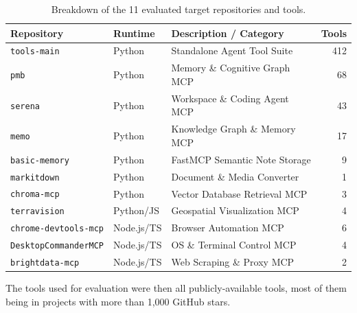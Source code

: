 \begin{table}[h]
\centering
\caption{Breakdown of the 11 evaluated target repositories and tools.}
\label{tab:evaluation_repositories}
\begin{tabular}{lllr}
\hline
\textbf{Repository} & \textbf{Runtime} & \textbf{Description / Category} & \textbf{Tools} \\
\hline
\texttt{tools-main}          & Python     & Standalone Agent Tool Suite    & 412 \\
\texttt{pmb}                 & Python     & Memory \& Cognitive Graph MCP  &  68 \\
\texttt{serena}              & Python     & Workspace \& Coding Agent MCP  &  43 \\
\texttt{memo}                & Python     & Knowledge Graph \& Memory MCP  &  17 \\
\texttt{basic-memory}        & Python     & FastMCP Semantic Note Storage  &   9 \\
\texttt{markitdown}          & Python     & Document \& Media Converter    &   1 \\
\texttt{chroma-mcp}          & Python     & Vector Database Retrieval MCP  &   3 \\
\texttt{terravision}         & Python/JS  & Geospatial Visualization MCP   &   4 \\
\texttt{chrome-devtools-mcp} & Node.js/TS & Browser Automation MCP         &   6 \\
\texttt{DesktopCommanderMCP} & Node.js/TS & OS \& Terminal Control MCP     &   4 \\
\texttt{brightdata-mcp}      & Node.js/TS & Web Scraping \& Proxy MCP      &   2 \\
\end{tabular}
\end{table}



The tools used for evaluation were then all publicly-available tools, most of them being in projects with more than 1,000 GitHub stars.

